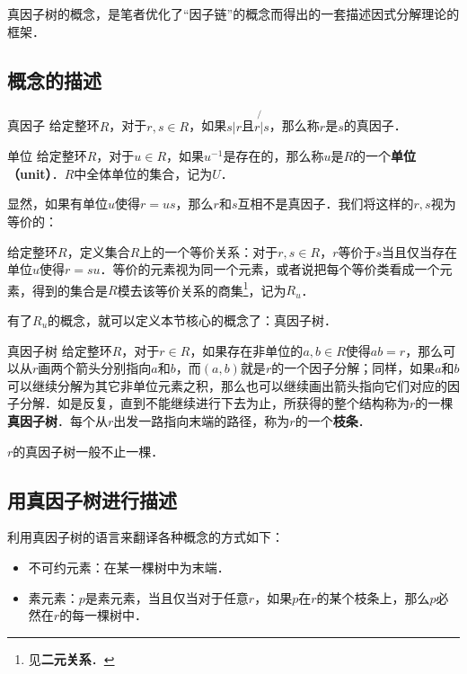 

真因子树的概念，是笔者优化了“因子链”的概念而得出的一套描述因式分解理论的框架．

\subsection{概念的描述}

\begin{definition}{真因子}
给定整环$R$，对于$r, s\in R$，如果$s|r$且$r\not{|}s$，那么称$r$是$s$的真因子．
\end{definition}

\begin{definition}{单位}
给定整环$R$，对于$u\in R$，如果$u^{-1}$是存在的，那么称$u$是$R$的一个\textbf{单位（unit）}．$R$中全体单位的集合，记为$U$．
\end{definition}

显然，如果有单位$u$使得$r=us$，那么$r$和$s$互相不是真因子．我们将这样的$r, s$视为等价的：

\begin{definition}{}
给定整环$R$，定义集合$R$上的一个等价关系：对于$r, s\in R$，$r$等价于$s$当且仅当存在单位$u$使得$r=su$．等价的元素视为同一个元素，或者说把每个等价类看成一个元素，得到的集合是$R$模去该等价关系的商集\footnote{见\textbf{二元关系}．}，记为$R_u$．
\end{definition}

有了$R_u$的概念，就可以定义本节核心的概念了：真因子树．

\begin{definition}{真因子树}
给定整环$R$，对于$r\in R$，如果存在非单位的$a, b\in R$使得$ab=r$，那么可以从$r$画两个箭头分别指向$a$和$b$，而$(a, b)$就是$r$的一个因子分解；同样，如果$a$和$b$可以继续分解为其它非单位元素之积，那么也可以继续画出箭头指向它们对应的因子分解．如是反复，直到不能继续进行下去为止，所获得的整个结构称为$r$的一棵\textbf{真因子树}．每个从$r$出发一路指向末端的路径，称为$r$的一个\textbf{枝条}．

$r$的真因子树一般不止一棵．
\end{definition}



\subsection{用真因子树进行描述}

利用真因子树的语言来翻译各种概念的方式如下：

\begin{itemize}
\item 不可约元素：在某一棵树中为末端．
\item 素元素：$p$是素元素，当且仅当对于任意$r$，如果$p$在$r$的某个枝条上，那么$p$必然在$r$的每一棵树中．
\end{itemize}





